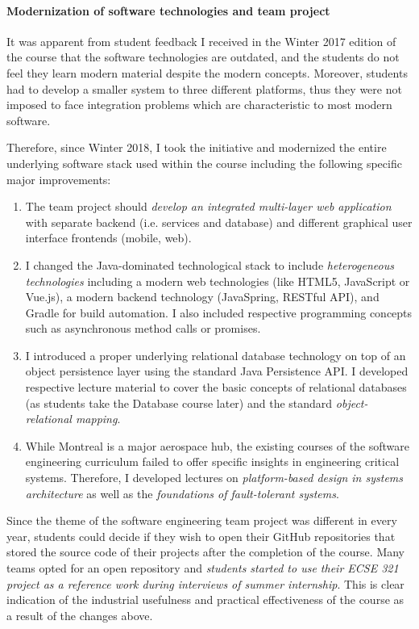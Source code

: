 \paragraph{Modernization of software technologies and team project}
It was apparent from student feedback I received in the Winter 2017 edition of the course that the software technologies are outdated, and the students do not feel they learn modern material despite the modern concepts. Moreover, students had to develop a smaller system to three different platforms, thus they were not imposed to face integration problems which are characteristic to most modern software.

Therefore, since Winter 2018, I took the initiative and modernized the entire underlying software stack used within the course including the following specific major improvements:
\begin{enumerate}
\item The team project should \emph{develop an integrated multi-layer web application} with separate backend (i.e. services and database) and different graphical user interface frontends (mobile, web). 
\item I changed the Java-dominated technological stack to include \emph{heterogeneous technologies} including a modern web technologies (like HTML5, JavaScript or Vue.js), a modern backend technology (JavaSpring, RESTful API), and Gradle for build automation. I also included respective programming concepts such as asynchronous method calls or promises. 
\item I introduced a proper underlying relational database technology on top of an object persistence layer using the standard Java Persistence API. I developed respective lecture material to cover the basic concepts of relational databases (as students take the Database course later) and the standard \emph{object-relational mapping}.  
\item While Montreal is a major aerospace hub, the existing courses of the software engineering curriculum failed to offer specific insights in engineering critical systems. Therefore, I developed lectures on \emph{platform-based design in systems architecture} as well as the \emph{foundations of fault-tolerant systems}.
\end{enumerate}

Since the theme of the software engineering team project was different in every year, students could decide if they wish to open their GitHub repositories that stored the source code of their projects after the completion of the course. Many teams opted for an open repository and \emph{students started to use their ECSE 321 project as a reference work during interviews of summer internship}. This is clear indication of the industrial usefulness and practical effectiveness of the course as a result of the changes above. 

